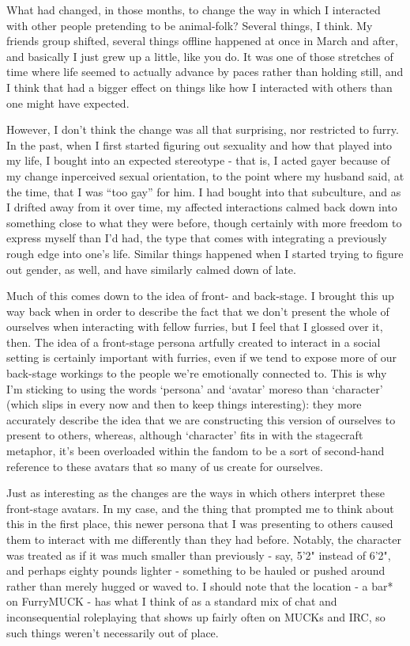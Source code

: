What had changed, in those months, to change the way in which I interacted with other people pretending to be animal-folk? Several things, I think. My friends group shifted, several things offline happened at once in March and after, and basically I just grew up a little, like you do. It was one of those stretches of time where life seemed to actually advance by paces rather than holding still, and I think that had a bigger effect on things like how I interacted with others than one might have expected.

However, I don't think the change was all that surprising, nor restricted to furry. In the past, when I first started figuring out sexuality and how that played into my life, I bought into an expected stereotype - that is, I acted gayer because of my change inperceived sexual orientation, to the point where my husband said, at the time, that I was ``too gay'' for him. I had bought into that subculture, and as I drifted away from it over time, my affected interactions calmed back down into something close to what they were before, though certainly with more freedom to express myself than I'd had, the type that comes with integrating a previously rough edge into one's life. Similar things happened when I started trying to figure out gender, as well, and have similarly calmed down of late.

Much of this comes down to the idea of front- and back-stage. I brought this up way back when in order to describe the fact that we don't present the whole of ourselves when interacting with fellow furries, but I feel that I glossed over it, then. The idea of a front-stage persona artfully created to interact in a social setting is certainly important with furries, even if we tend to expose more of our back-stage workings to the people we're emotionally connected to. This is why I'm sticking to using the words `persona' and `avatar' moreso than `character' (which slips in every now and then to keep things interesting): they more accurately describe the idea that we are constructing this version of ourselves to present to others, whereas, although `character' fits in with the stagecraft metaphor, it's been overloaded within the fandom to be a sort of second-hand reference to these avatars that so many of us create for ourselves.

Just as interesting as the changes are the ways in which others interpret these front-stage avatars. In my case, and the thing that prompted me to think about this in the first place, this newer persona that I was presenting to others caused them to interact with me differently than they had before. Notably, the character was treated as if it was much smaller than previously - say, 5'2" instead of 6'2", and perhaps eighty pounds lighter - something to be hauled or pushed around rather than merely hugged or waved to. I should note that the location - a bar* on FurryMUCK - has what I think of as a standard mix of chat and inconsequential roleplaying that shows up fairly often on MUCKs and IRC, so such things weren't necessarily out of place.

